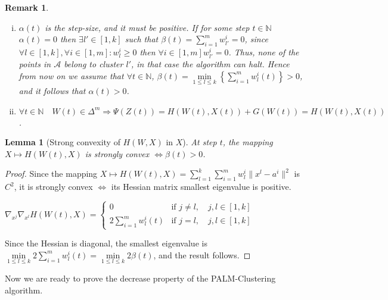 \documentclass[11pt]{article}
\numberwithin{equation}{section}
\newtheorem{lemma}{Lemma}[proposition]
\newtheorem{remark}{Remark}
\begin{document}
\begin{remark} 
	\begin{enumerate}[(i)]
		\item $\alpha(t)$ is the step-size, and it must be positive. If for some step $t \in \mathbb{N}$ $\alpha(t)=0$ then $\exists l' \in \left[ 1,k \right]$ such that $\beta(t) = \sum\limits_{i=1}^{m} w^i_{l'} = 0$, since $\forall l \in \left[ 1,k \right] ,\forall i \in \left[ 1,m \right] : w^i_l \geq 0$ then $\forall i \in \left[ 1,m \right] w^i_{l'}=0$. Thus, none of the points in $\mathcal{A}$ belong to cluster $l'$, in that case the algorithm can halt. Hence from now on we assume that $\forall t \in \mathbb{N}$, $\beta(t) = \min\limits_{1 \leq l \leq k} \left\lbrace \sum\limits_{i=1}^{m} w^i_l(t)\right \rbrace > 0$, and it follows that $\alpha(t) > 0 $.
		\item $\forall t \in \mathbb{N} \quad W(t) \in \Delta^m \Rightarrow \Psi(Z(t)) = H(W(t),X(t)) + G(W(t)) = H(W(t),X(t))$.
	\end{enumerate}
\end{remark}

\begin{lemma}[Strong convexity of $H(W,X)$ in $X$] 
At step $t$, the mapping $X \mapsto H(W(t),X)$ is strongly convex $\Leftrightarrow \beta(t) > 0$.
\end{lemma}

\begin{proof}
Since the mapping $X \mapsto H(W(t),X) = 
\sum\limits_{l=1}^{k} \sum\limits_{i=1}^{m} w^i_l \|x^l - a^i\|^2$ is $C^2$, it is strongly convex $\Leftrightarrow$  its Hessian matrix smallest eigenvalue is positive.

\begin{center}
$\nabla_{x^j} \nabla_{x^l} H(W(t),X) = 
\begin{cases} 0 &\mbox{if } j \neq l, \quad j,l \in \left[ 1,k \right] 
\\ 2\sum\limits_{i=1}^{m} w^i_l(t) &\mbox{if } j = l, \quad j,l \in \left[ 1,k \right] \end{cases}$
\end{center}

Since the Hessian is diagonal, the smallest eigenvalue is $\min\limits_{1 \leq l \leq k} 2\sum\limits_{i=1}^{m} w^i_l(t) = 
\min\limits_{1 \leq l \leq k} 2\beta(t)$, and the result follows.
\end{proof}

Now we are ready to prove the decrease property of the PALM-Clustering algorithm.
\end{document}
